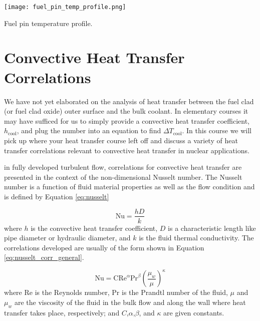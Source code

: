 \begin{marginfigure}
\texttt{[image: fuel\_pin\_temp\_profile.png]}
\caption{Fuel pin temperature profile.}
\label{fig:pin_temp_profile}
\end{marginfigure}

\section{Convective Heat Transfer Correlations}
We have not yet elaborated on the analysis of heat transfer between the fuel clad (or fuel clad oxide) outer surface and the bulk coolant.  In elementary courses it may have sufficed for us to simply provide a convective heat transfer coefficient, $h_{\text{cool}}$, and plug the number into an equation to find $\Delta T_{\text{cool}}$.  In this course we will pick up where your heat transfer course left off and discuss a variety of heat transfer correlations relevant to convective heat transfer in nuclear applications.

 in fully developed turbulent flow, correlations for convective heat transfer are presented in the context of the non-dimensional Nusselt number.  The Nusselt number is a function of fluid material properties as well as the flow condition and is defined by Equation \ref{eq:nusselt}

\begin{equation}
\text{Nu} = \frac{h D}{k}
\label{eq:nusselt}
\end{equation}
where $h$ is the convective heat transfer coefficient, $D$ is a characteristic length like pipe diameter or hydraulic diameter, and $k$ is the fluid thermal conductivity.  The correlations developed are usually of the form shown in Equation \ref{eq:nusselt_corr_general}.

\begin{equation}
\text{Nu} = \text{C}\text{Re}^{\alpha}\text{Pr}^{\beta} \left(\frac{\mu_w}{\mu} \right)^{\kappa}
\label{eq:nusselt_corr_general}
\end{equation}  
where $\text{Re}$ is the Reynolds number, $\text{Pr}$ is the Prandtl number of the fluid, $\mu$ and $\mu_w$ are the viscosity of the fluid in the bulk flow and along the wall where heat transfer takes place, respectively; and $C$,$\alpha$,$\beta$, and $\kappa$ are given constants.

